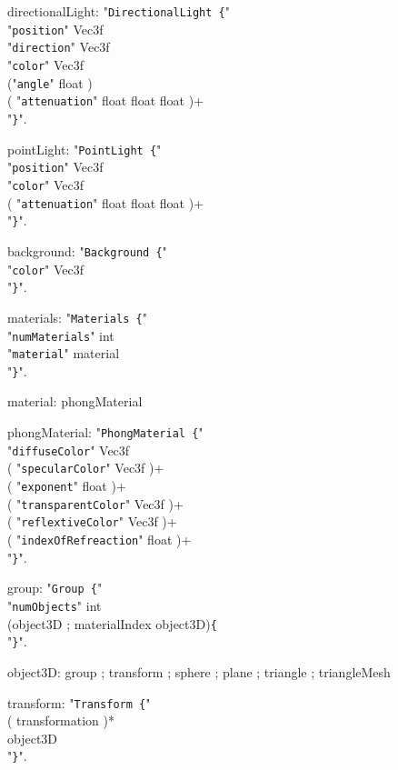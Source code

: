 \documentclass[twoside]{article}
\begin{document}
\begin{grammar}
directionalLight: "\verb!DirectionalLight {!"\\
    "\verb!position!" Vec3f\\
    "\verb!direction!" Vec3f\\
    "\verb!color!" Vec3f\\
    ("\verb!angle!" float )\\
    ( "\verb!attenuation!"  float float float )+\\
"\verb!}!".

pointLight: "\verb!PointLight {!"\\
    "\verb!position!" Vec3f\\
    "\verb!color!" Vec3f\\
    ( "\verb!attenuation!"  float float float )+\\
"\verb!}!".

background: "\verb!Background {!"\\
    "\verb!color!" Vec3f\\
"\verb!}!".

materials: "\verb!Materials {!"\\
    "\verb!numMaterials!" int\\
    "\verb!material!" material\\
"\verb!}!".

material: phongMaterial

phongMaterial: "\verb!PhongMaterial {!"\\
    "\verb!diffuseColor!" Vec3f\\
    ( "\verb!specularColor!"  Vec3f )+\\
    ( "\verb!exponent!"  float )+\\
    ( "\verb!transparentColor!"  Vec3f )+\\
    ( "\verb!reflextiveColor!"  Vec3f )+\\
    ( "\verb!indexOfRefreaction!"  float )+\\
"\verb!}!".

group: "\verb!Group {!"\\
    "\verb!numObjects!" int\\
    (object3D ; materialIndex object3D)\verb!{!\\
"\verb!}!".

object3D: group ; transform ; sphere ; plane ; triangle ; triangleMesh

transform: "\verb!Transform {!"\\
    ( transformation )*\\
    object3D\\
"\verb!}!".


\end{grammar}
\end{document}
